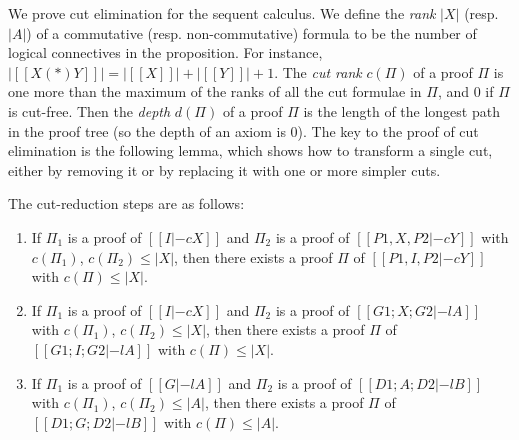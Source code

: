 We prove cut elimination for the sequent calculus. We define the
\textit{rank} $|X|$ (resp. $|A|$) of a commutative (resp. non-commutative)
formula to be the number of logical connectives in the proposition. For
instance, $|[[X (*) Y]]| = |[[X]]| + |[[Y]]| + 1$. The \textit{cut rank}
$c(\Pi)$ of a proof $\Pi$ is one more than the maximum of the ranks of all
the cut formulae in $\Pi$, and $0$ if $\Pi$ is cut-free. Then the
\textit{depth} $d(\Pi)$ of a proof $\Pi$ is the length of the longest path
in the proof tree (so the depth of an axiom is $0$). The key to the proof
of cut elimination is the following lemma, which shows how to transform a
single cut, either by removing it or by replacing it with one or more
simpler cuts.
\begin{lemma}
  \label{lem:cut-reduction}
  The cut-reduction steps are as follows:
  \begin{enumerate}
  \item If $\Pi_1$ is a proof of $[[I |-c X]]$ and $\Pi_2$ is a proof of
  $[[P1,X,P2 |-c Y]]$ with $c(\Pi_1)$, $c(\Pi_2)\leq |X|$, then there exists
  a proof $\Pi$ of $[[P1, I, P2 |-c Y]]$ with $c(\Pi)\leq |X|$.
  \item If $\Pi_1$ is a proof of $[[I |-c X]]$ and $\Pi_2$ is a proof of
  $[[G1; X; G2 |-l A]]$ with $c(\Pi_1)$, $c(\Pi_2)\leq |X|$, then there
  exists a proof $\Pi$ of $[[G1; I; G2 |-l A]]$ with $c(\Pi)\leq |X|$.
  \item If $\Pi_1$ is a proof of $[[G |-l A]]$ and $\Pi_2$ is a proof of
  $[[D1; A; D2 |-l B]]$ with $c(\Pi_1)$, $c(\Pi_2)\leq |A|$, then there
  exists a proof $\Pi$ of $[[D1; G; D2 |-l B]]$ with $c(\Pi)\leq |A|$.
  \end{enumerate}
\end{lemma}
